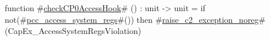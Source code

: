 function #\hyperref[zcheckCP0AccessHook]{checkCP0AccessHook}# () : unit -> unit = {
  if not(#\hyperref[zpcczyaccesszysystemzyregs]{pcc\_access\_system\_regs}#()) then
    #\hyperref[zraisezyc2zyexceptionzynoreg]{raise\_c2\_exception\_noreg}#(CapEx_AccessSystemRegsViolation)
}
